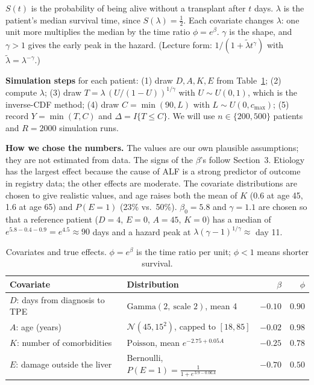 \documentclass[10pt,a4paper]{article}
\begin{document}
$S(t)$ is the probability of being alive without a transplant after $t$ days. $\lambda$ is the patient's median survival time, since $S(\lambda)=\tfrac12$. Each covariate changes $\lambda$: one unit more multiplies the median by the time ratio $\phi=e^{\beta}$. $\gamma$ is the shape, and $\gamma>1$ gives the early peak in the hazard. (Lecture form: $1/(1+\tilde\lambda t^{\gamma})$ with $\tilde\lambda=\lambda^{-\gamma}$.)

\textbf{Simulation steps} for each patient: (1) draw $D,A,K,E$ from Table~\ref{tab:cov}; (2) compute $\lambda$; (3) draw $T=\lambda\,(U/(1-U))^{1/\gamma}$ with $U\sim U(0,1)$, which is the inverse-CDF method; (4) draw $C=\min(90,L)$ with $L\sim U(0,c_{\max})$; (5) record $Y=\min(T,C)$ and $\Delta=I\{T\le C\}$. We will use $n\in\{200,500\}$ patients and $R=2000$ simulation runs.

\textbf{How we chose the numbers.} The values are our own plausible assumptions; they are not estimated from data. The signs of the $\beta$'s follow Section~3. Etiology has the largest effect because the cause of ALF is a strong predictor of outcome in registry data; the other effects are moderate. The covariate distributions are chosen to give realistic values, and age raises both the mean of $K$ (0.6 at age 45, 1.6 at age 65) and $P(E=1)$ (23\% vs.\ 50\%). $\beta_0=5.8$ and $\gamma=1.1$ are chosen so that a reference patient ($D=4$, $E=0$, $A=45$, $K=0$) has a median of $e^{5.8-0.4-0.9}=e^{4.5}\approx90$ days and a hazard peak at $\lambda(\gamma-1)^{1/\gamma}\approx$ day 11.

\begin{table}[H]
\centering\footnotesize
\caption{Covariates and true effects. $\phi=e^{\beta}$ is the time ratio per unit; $\phi<1$ means shorter survival.}\label{tab:cov}
\begin{tabular}{@{}llrr@{}}
\toprule
Covariate & Distribution & $\beta$ & $\phi$ \\
\midrule
$D$: days from diagnosis to TPE & $\mathrm{Gamma}(2,\ \text{scale } 2)$, mean 4 & $-0.10$ & $0.90$ \\
$A$: age (years) & $\mathcal N(45,15^2)$, capped to $[18,85]$ & $-0.02$ & $0.98$ \\
$K$: number of comorbidities & $\mathrm{Poisson}$, mean $e^{-2.75+0.05A}$ & $-0.25$ & $0.78$ \\
$E$: damage outside the liver & $\mathrm{Bernoulli}$, $P(E{=}1)=\frac{1}{1+e^{\,3.9-0.06A}}$ & $-0.70$ & $0.50$ \\
\bottomrule
\end{tabular}
\end{table}
\vspace{-10pt}
\end{document}
